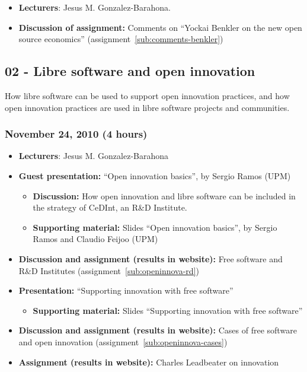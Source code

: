 \documentclass[a4paper]{article}
\begin{document}
\begin{itemize}
 \item \textbf{Lecturers}: Jesus M. Gonzalez-Barahona.
\item \textbf{Discussion of assignment:} Comments on ``Yockai Benkler on the new open source economics'' (assignment~\ref{sub:comments-benkler})
\end{itemize}

\subsection{02 - Libre software and open innovation}

How libre software can be used to support open innovation practices, and how open innovation practices are used in libre software projects and communities.

\subsubsection{November 24, 2010 (4 hours)}

\begin{itemize}
\item \textbf{Lecturers}: Jesus M. Gonzalez-Barahona
\item \textbf{Guest presentation:} ``Open innovation basics'', by Sergio Ramos (UPM)
  \begin{itemize}
  \item \textbf{Discussion:} How open innovation and libre software can be included in the strategy of CeDInt, an R\&D Institute.
  \item \textbf{Supporting material:} Slides ``Open innovation basics'', by Sergio Ramos and Claudio Feijoo (UPM)
  \end{itemize}
\item \textbf{Discussion and assignment (results in website):} Free software and R\&D Institutes (assignment~\ref{sub:openinnova-rd})
\item \textbf{Presentation:} ``Supporting innovation with free software''
  \begin{itemize}
  \item \textbf{Supporting material:} Slides ``Supporting innovation with free software''
  \end{itemize}
\item \textbf{Discussion and assignment (results in website):} Cases of free software and open innovation (assignment~\ref{sub:openinnova-cases})
\item \textbf{Assignment (results in website):} Charles Leadbeater on innovation
\end{itemize}
\end{document}
